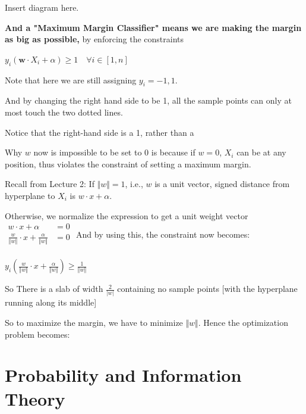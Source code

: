 \documentclass{report}
\begin{document}
Insert diagram here.\newline\newline

\textbf{And a "Maximum Margin Classifier" means we are making the margin as big as possible, } by enforcing the constraints \newline
\centerline{$y_i(\bm{w} \cdot X_i + \alpha) \geq 1 \quad \forall i \in [1,n]$}\newline\newline

Note that here we are still assigning $y_i = -1, 1$.

And by changing the right hand side to be 1, all the sample points can only at most touch the two dotted lines.

Notice that the right-hand side is a 1, rather than a 

Why $w$ now is impossible to be set to 0 is because if $w=0$, $X_i$ can be at any position, thus violates the constraint of setting a maximum margin.

Recall from Lecture 2: If $\Vert w \Vert = 1$, i.e., $w$ is a unit vector, signed distance from hyperplane to $X_i$ is $w \cdot x + \alpha$. \newline

Otherwise, we normalize the expression to get a unit weight vector\newline
$\begin{aligned}
	w \cdot x + \alpha &= 0 \\
    \frac{w}{\Vert w \Vert} \cdot x + \frac{\alpha}{\Vert w \Vert} &= 0 \\
\end{aligned}$
And by using this, the constraint now becomes:\newline
\centerline{$y_i(\frac{w}{\Vert w \Vert} \cdot x + \frac{\alpha}{\Vert w \Vert}) \geq \frac{1}{\Vert w \Vert}$}

So There is a slab of width $\frac{2}{|w|}$ containing no sample points [with the hyperplane running along its middle]\newline

So to maximize the margin, we have to minimize $\Vert w \Vert$. Hence the optimization problem becomes:\\

\chapter{Probability and Information Theory}
\end{document}
